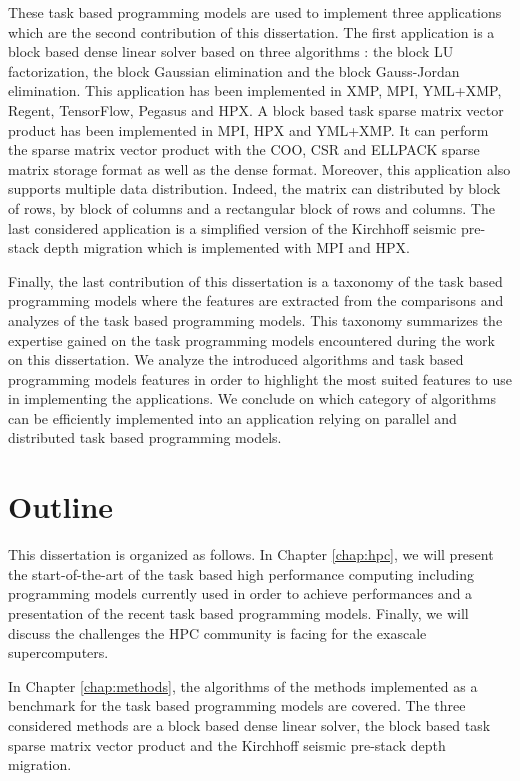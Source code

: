 These task based programming models are used to implement three applications which are the second contribution of this dissertation.
The first application is a block based dense linear solver based on three algorithms : the block LU factorization, the block Gaussian elimination and the block Gauss-Jordan elimination.
This application has been implemented in XMP, MPI, YML+XMP, Regent, TensorFlow, Pegasus and HPX.
A block based task sparse matrix vector product has been implemented in MPI, HPX and YML+XMP.
It can perform the sparse matrix vector product with the COO, CSR and ELLPACK sparse matrix storage format as well as the dense format.
Moreover, this application also supports multiple data distribution.
Indeed, the matrix can distributed by block of rows, by block of columns and a rectangular block of rows and columns.
The last considered application is a simplified version of the Kirchhoff seismic pre-stack depth migration which is implemented with MPI and HPX.

Finally, the last contribution of this dissertation is a taxonomy of the task based programming models where the features are extracted from the comparisons and analyzes of the task based programming models.
This taxonomy summarizes the expertise gained on the task programming models encountered during the work on this dissertation.
We analyze the introduced algorithms and task based programming models features in order to highlight the most suited features to use in implementing the applications.
We conclude on which category of algorithms can be efficiently implemented into an application relying on parallel and distributed task based programming models.

\section{Outline}
This dissertation is organized as follows. In Chapter \ref{chap:hpc}, we will present the start-of-the-art of the task based high performance computing including programming models currently used in order to achieve performances and a presentation of the recent task based programming models.
Finally, we will discuss the challenges the HPC community is facing for the exascale supercomputers.

In Chapter \ref{chap:methods}, the algorithms of the methods implemented as a benchmark for the task based programming models are covered.
The three considered methods are a block based dense linear solver, the block based task sparse matrix vector product and the Kirchhoff seismic pre-stack depth migration.

